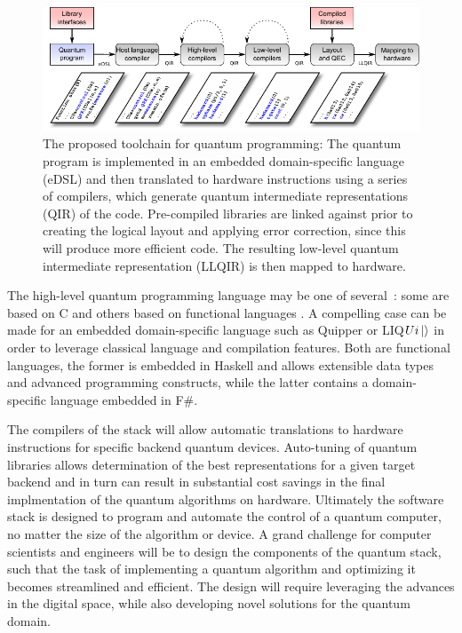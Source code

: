 \documentclass[journal]{IEEEtran}
\begin{document}
\begin{figure}[t]
\centering
\includegraphics[width=\textwidth]{figures/coarse_toolchain}
\caption{The proposed toolchain for quantum programming: The quantum program is implemented in an embedded domain-specific language (eDSL) and then translated to hardware instructions using a series of compilers, which generate quantum intermediate representations (QIR) of the code. Pre-compiled libraries are linked against prior to creating the logical layout and applying error correction, since this will produce more efficient code. The resulting low-level quantum intermediate representation (LLQIR) is then mapped to hardware.}
\label{fig:toolchain}
\end{figure}

The high-level quantum programming language may be one of several~\cite{gay2006quantum}:
some are based on C \cite{omer1998procedural} and others based on functional languages \cite{green13,wecker14}.
A compelling case can be made for an embedded domain-specific language such as Quipper \cite{green13} or LIQ$Ui\ket{} $\cite{wecker14} in order to leverage classical language and compilation features.
Both are functional languages, the former is embedded in Haskell and allows extensible data types and advanced programming constructs,
while the latter contains a domain-specific language embedded in F\#.

The compilers of the stack will allow automatic translations to hardware instructions for specific backend quantum devices.  Auto-tuning of quantum libraries allows determination of the best representations for a given target backend and in turn can result in substantial cost savings in the final implmentation of the quantum algorithms on hardware.  Ultimately the software stack is designed to program and automate the control of a quantum computer, no matter the size of the algorithm or device.
A grand challenge for computer scientists and engineers will be to design the components of the quantum stack, such that the task of implementing a quantum algorithm and optimizing it becomes streamlined and efficient. The design will require leveraging the advances in the digital space, while also developing novel solutions for the quantum domain.
\end{document}
